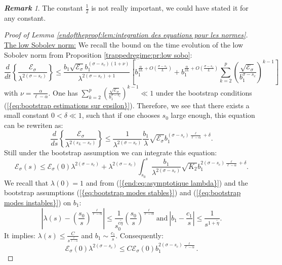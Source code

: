 \documentclass[11pt,a4paper,reqno]{amsart}
\theoremstyle{remark}
\newtheorem{remark}[theorem]{\it \bf{Remark}\/}
\numberwithin{equation}{section}
\begin{document}
\begin{remark}
The constant $\frac{1}{2}$ is not really important, we could have stated it for any constant.
\end{remark}

\begin{proof}[ Proof of Lemma \ref{endoftheproof:lem:integration des equations pour les normes}] \underline{The low Sobolev norm:} We recall the bound on the time evolution of the low Sobolev norm from Proposition \ref{trappedregime:pr:low sobo}:
$$
\frac{d}{dt}\left\{ \frac{\mathcal{E}_{\sigma}}{\lambda^{2(\sigma-s_c)}} \right\} \leq \frac{b_1 \sqrt{\mathcal{E}_{\sigma}}b_1^{(\sigma-s_c)(1+\nu)}}{\lambda^{2(\sigma-s_c)+1}} \left[ b_1^{\frac{\alpha}{2L}+O\left(\frac{\sigma-s_c}{L} \right)} + b_1^{\frac{\alpha}{2L}+O\left(\frac{\sigma-s_c}{L} \right)}\sum_{k=2}^p\left( \frac{\sqrt{\mathcal{E}_{\sigma}}}{b_1^{\sigma-s_c}}\right)^{k-1}\right] 
$$
with $\nu=\frac{\alpha}{\ell-\alpha}$. One has $\sum_{k=2}^p\left( \frac{\sqrt{\mathcal{E}_{\sigma}}}{b_1^{\sigma-s_c}}\right)^{k-1}\ll 1$ under the bootstrap conditions {{\rm (\ref{{eq:bootstrap estimations sur epsilon}})}}. Therefore, we see that there exists a small constant $0<\delta\ll 1$, such that if one chooses $s_0$ large enough, this equation can be rewriten as:
$$
\frac{d}{ds} \left\{ \frac{\mathcal{E}_{\sigma}}{\lambda^{2(s_L-s_c)}} \right\}\leq \frac{1}{\lambda^{2(\sigma-s_c)}}\frac{b_1}{\lambda}\sqrt{\mathcal{E}_{\sigma}}b_1^{(\sigma-s_c)\frac{\ell}{\ell-\alpha}+\delta}.
$$
Still under the bootstrap assumption we can integrate this equation:
\begin{equation} \label{end:eq:estimation low intermediaire}
\mathcal{E}_{\sigma}(s)\leq \mathcal{E}_{\sigma}(0)\lambda^{2(\sigma-s_c)}+\lambda^{2(\sigma-s_c)}\int_{s_0}^s \frac{b_1}{\lambda^{2(\sigma-s_c)}}\sqrt{K_2} b_1^{2(\sigma-s_c)\frac{\ell}{\ell-\alpha}+\delta} .
\end{equation}
We recall that $\lambda(0)=1$ and from {{\rm (\ref{{end:eq:asymptotique lambda}})}} and the bootstrap assumptions {{\rm (\ref{{eq:bootstrap modes stables}})}} and {{\rm (\ref{{eq:bootstrap modes instables}})}} on $b_1$:
$$
\left| \lambda(s)-\left(\frac{s_0}{s}\right)^{\frac{\ell}{\ell-\alpha}} \right|\leq  \frac{1}{s_0^{c\tilde{\eta}}}\left(\frac{s_0}{s} \right)^{\frac{\ell}{\ell-\alpha}} \ \text{and} \ \left|b_1-\frac{c_1}{s} \right|\leq \frac{1}{s^{1+\tilde{\eta}}} .
$$
It implies: $\lambda(s)\leq \frac{C}{s^{\frac{\ell}{\ell-\alpha}}}$ and $b_1\sim\frac{c_1}{s}$. Consequently:
$$
\mathcal{E}_{\sigma}(0)\lambda^{2(\sigma-s_c)}\leq C\mathcal{E}_{\sigma}(0)b_1^{2(\sigma-s_c)\frac{\ell}{\ell-\alpha}} .
$$
\end{proof}
\end{document}
